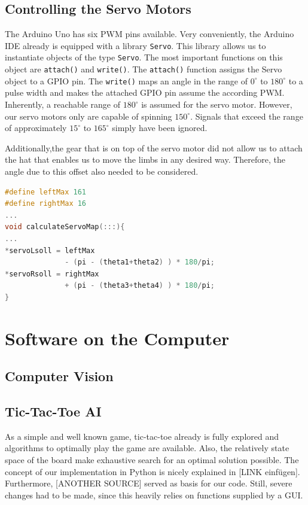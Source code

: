 \documentclass{sig-alternate-05-2015}
\begin{document}
\subsection{Controlling the Servo Motors}
The Arduino Uno has six PWM pins available.
Very conveniently, the Arduino IDE already is equipped with a library \texttt{Servo}. This library allows us to instantiate objects of the type \texttt{Servo}. The most important functions on this object are \texttt{attach()} and \texttt{write()}. The \texttt{attach()} function assigns the Servo object to a GPIO pin. The \texttt{write()} maps an angle in the range of $0^\circ$ to $180^\circ$ to a pulse width and makes the attached GPIO pin assume the according PWM. Inherently, a reachable range of $180^\circ$ is assumed for the servo motor. However, our servo motors only are capable of spinning $150^\circ$. Signals that exceed the range of approximately $15^\circ$ to $165^\circ$ simply have been ignored.

Additionally,the gear that is on top of the servo motor did not allow us to attach the hat that enables us to move the limbs in any desired way. Therefore, the angle due to this offset also needed to be considered. 
\begin{lstlisting}[language = c++]
#define leftMax 161
#define rightMax 16
...
void calculateServoMap(:::){
...
*servoLsoll = leftMax 
              - (pi - (theta1+theta2) ) * 180/pi; 
*servoRsoll = rightMax 
              + (pi - (theta3+theta4) ) * 180/pi;
}
\end{lstlisting}


\section{Software on the Computer}
\subsection{Computer Vision}
\subsection{Tic-Tac-Toe AI}
As a simple and well known game, tic-tac-toe already is fully explored and algorithms to optimally play the game are available. Also, the relatively state space of the board make exhaustive search for an optimal solution possible. The concept of our implementation in Python is nicely explained in [LINK einfügen]. Furthermore, [ANOTHER SOURCE] served as basis for our code. Still, severe changes had to be made, since this heavily relies on functions supplied by a GUI.
\end{document}
